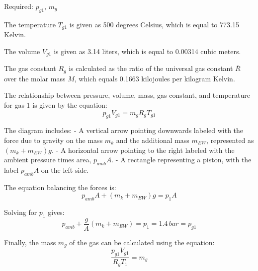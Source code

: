 Required: \( p_{g1} \), \( m_g \)

The temperature \( T_{g1} \) is given as 500 degrees Celsius, which is equal to 773.15 Kelvin.

The volume \( V_{g1} \) is given as 3.14 liters, which is equal to 0.00314 cubic meters.

The gas constant \( R_g \) is calculated as the ratio of the universal gas constant \( \overline{R} \) over the molar mass \( M \), which equals 0.1663 kilojoules per kilogram Kelvin.

The relationship between pressure, volume, mass, gas constant, and temperature for gas 1 is given by the equation:
\[ p_{g1} V_{g1} = m_g R_g T_{g1} \]

The diagram includes:
- A vertical arrow pointing downwards labeled with the force due to gravity on the mass \( m_k \) and the additional mass \( m_{EW} \), represented as \( (m_k + m_{EW})g \).
- A horizontal arrow pointing to the right labeled with the ambient pressure times area, \( p_{amb} A \).
- A rectangle representing a piston, with the label \( p_{amb} A \) on the left side.

The equation balancing the forces is:
\[ p_{amb} A + (m_k + m_{EW})g = p_{1} A \]

Solving for \( p_1 \) gives:
\[ p_{amb} + \frac{g}{A} (m_k + m_{EW}) = p_{1} = 1.4 \, bar = p_{g1} \]

Finally, the mass \( m_g \) of the gas can be calculated using the equation:
\[ \frac{p_{g1} V_{g1}}{R_g T_{1}} = m_g \]